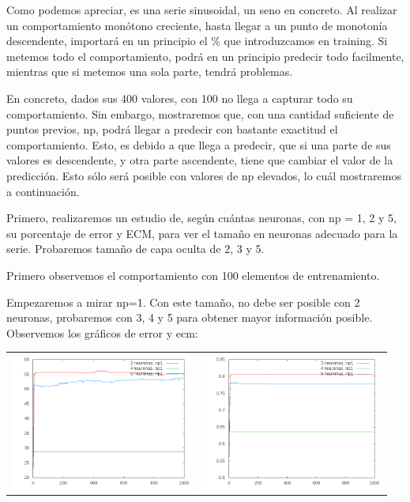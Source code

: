 \documentclass[12pt]{article}
\begin{document}
Como podemos apreciar, es una serie sinusoidal, un seno en concreto. Al realizar un comportamiento monótono creciente, hasta llegar a un punto de monotonía descendente, importará en un principio el \% que introduzcamos en training. Si metemos todo el comportamiento, podrá en un principio predecir todo facilmente, mientras que si metemos una sola parte, tendrá problemas.

En concreto, dados sus 400 valores, con 100 no llega a capturar todo su comportamiento. Sin embargo, mostraremos que, con una cantidad suficiente de puntos previos, np, podrá llegar a predecir con bastante exactitud el comportamiento. Esto, es debido a que llega a predecir, que si una parte de sus valores es descendente, y otra parte ascendente, tiene que cambiar el valor de la predicción. Esto sólo será posible con valores de np elevados, lo cuál mostraremos a continuación.

Primero, realizaremos un estudio de, según cuántas neuronas, con np = 1, 2 y 5, su porcentaje de error y ECM, para ver el tamaño en neuronas adecuado para la serie. Probaremos tamaño de capa oculta de 2, 3 y 5.

Primero observemos el comportamiento con 100 elementos de entrenamiento.

Empezaremos a mirar np=1. Con este tamaño, no debe ser posible con 2 neuronas, probaremos con 3, 4 y 5 para obtener mayor información posible. Observemos los gráficos de error y ecm:

\begin{center}
   \begin{tabular}{ c  c }
     \includegraphics[width=6cm]{graficosparte2a/error_train_np1_25} &
     \includegraphics[width=6cm]{graficosparte2a/ecm_train_np1_25}\\ 
   \end{tabular}
 \end{center}
 
\end{document}
